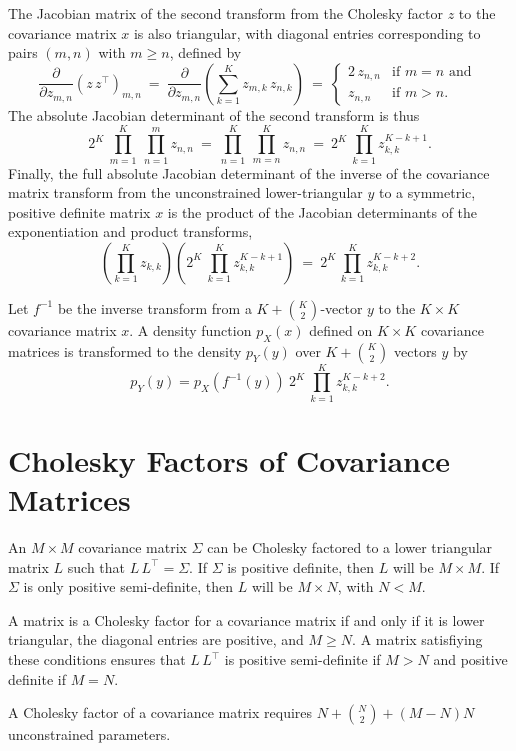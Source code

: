 The Jacobian matrix of the second transform from the Cholesky factor $z$ to
the covariance matrix $x$ is also triangular, with diagonal entries
corresponding to pairs $(m,n)$ with $m \geq n$, defined by
\[
\frac{\partial}{\partial z_{m,n}}
\left( z \, z^{\top} \right)_{m,n}
\ = \
\frac{\partial}{\partial z_{m,n}}
\left( \sum_{k=1}^K z_{m,k} \, z_{n,k} \right)
\ = \
\left\{
\begin{array}{cl}
2 \, z_{n,n} & \mbox{if } m = n \mbox{ and }
\\[4pt]
z_{n,n} & \mbox{if } m > n.
\end{array}
\right.
\]
%
The absolute Jacobian determinant of the second transform is thus
\[
2^{K} \ \prod_{m = 1}^{K} \ \prod_{n=1}^{m} z_{n,n}
\ = \
\prod_{n=1}^K \ \prod_{m=n}^K z_{n,n}
\ = \ 
2^{K} \ \prod_{k=1}^K z_{k,k}^{K - k + 1}.
\]
Finally, the full absolute Jacobian determinant of the inverse
of the covariance matrix transform from the unconstrained lower-triangular 
$y$ to a symmetric, positive definite matrix $x$ is the product of the
Jacobian determinants of the exponentiation and product transforms,
\[
\left( \prod_{k=1}^K z_{k,k} \right)
\left( 
2^{K} \ \prod_{k=1}^K z_{k,k}^{K - k + 1}
\right) 
\ = \
2^K
\, \prod_{k=1}^K z_{k,k}^{K-k+2}.
\]

Let $f^{-1}$ be the inverse transform from a $K + \binom{K}{2}$-vector
$y$ to the $K \times K$ covariance matrix $x$.  A density function
$p_X(x)$ defined on $K \times K$ covariance matrices is transformed to
the density $p_Y(y)$ over $K + \binom{K}{2}$ vectors $y$ by
\[
p_Y(y) = p_X(f^{-1}(y)) \ 2^K \ \prod_{k=1}^K z_{k,k}^{K-k+2}.
\]

\section{Cholesky Factors of Covariance Matrices}

An $M \times M$ covariance matrix $\Sigma$ can be Cholesky factored to
a lower triangular matrix $L$ such that $L\,L^{\top} = \Sigma$.  If
$\Sigma$ is positive definite, then $L$ will be $M \times M$.  If
$\Sigma$ is only positive semi-definite, then $L$ will be $M \times N$,
with $N < M$.  

A matrix is a Cholesky factor for a covariance matrix if and only if
it is lower triangular, the diagonal entries are positive, and $M \geq
N$.  A matrix satisfiying these conditions ensures that $L \,
L^{\top}$ is positive semi-definite if $M > N$ and positive definite
if $M = N$.

A Cholesky factor of a covariance matrix requires $N + \binom{N}{2} +
(M - N)N$ unconstrained parameters.

